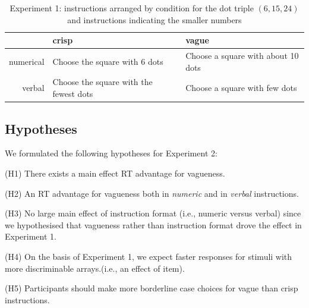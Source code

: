 \documentclass[%
man,		%
floatsintext,%
apacite%
]{apa6}
\begin{document}

\begin{table}[htbp]
\caption{Experiment 1: instructions arranged by condition for the dot triple $(6,15,24)$ and instructions indicating the smaller numbers}
\label{instre3}
\begin{tabular}{rll}
&crisp&vague\\
\midrule
numerical	&	Choose the square with 6 dots 			& 	Choose a square with about 10 dots	\\
verbal	&	Choose the square with the fewest dots	&	Choose a square with few dots		\\
\midrule
\end{tabular}
\end{table}

\subsection{Hypotheses} %
\noindent We formulated the following hypotheses for Experiment 2:

{\small
\begin{APAenumerate}
	\item [(H1)] There exists a main effect RT advantage for vagueness.
	\item [(H2)] An RT advantage for vagueness both in \emph{numeric} and in \emph{verbal} instructions.
	\item [(H3)] No large main effect of instruction format (i.e., numeric versus verbal) since we hypothesised that vagueness rather than instruction format drove the effect in Experiment 1.
	\item [(H4)] On the basis of Experiment 1, we expect faster responses for stimuli with more discriminable arrays.(i.e., an effect of item).
	\item [(H5)] Participants should make more borderline case choices for vague than crisp instructions.
\end{APAenumerate}
}
\end{document}
